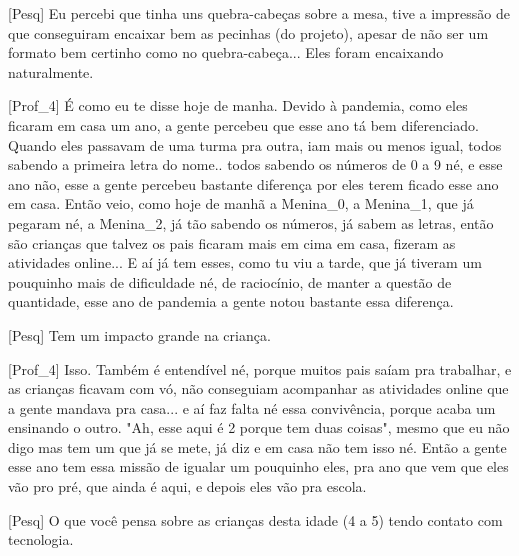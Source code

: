 [Pesq] Eu percebi que tinha uns quebra-cabeças sobre a mesa, tive a impressão de que conseguiram encaixar bem as pecinhas (do projeto), apesar de não ser um formato bem certinho como no quebra-cabeça... Eles foram encaixando naturalmente.

[Prof\_4] É como eu te disse hoje de manha. Devido à pandemia, como eles ficaram em casa um ano, a gente percebeu que esse ano tá bem diferenciado. Quando eles passavam de uma turma pra outra, iam mais ou menos igual, todos sabendo a primeira letra do nome.. todos sabendo os números de 0 a 9 né, e esse ano não, esse a gente percebeu bastante diferença por eles terem ficado esse ano em casa. Então veio, como hoje de manhã a Menina\_0, a Menina\_1, que já pegaram né, a Menina\_2, já tão sabendo os números, já sabem as letras, então são crianças que talvez os pais ficaram mais em cima em casa, fizeram as atividades online... E aí já tem esses, como tu viu a tarde, que já tiveram um pouquinho mais de dificuldade né, de raciocínio, de manter a questão de quantidade, esse ano de pandemia a gente notou bastante essa diferença.

[Pesq] Tem um impacto grande na criança.

[Prof\_4] Isso. Também é entendível né, porque muitos pais saíam pra trabalhar, e as crianças ficavam com vó, não conseguiam acompanhar as atividades online que a gente mandava pra casa... e aí faz falta né essa convivência, porque acaba um ensinando o outro. "Ah, esse aqui é 2 porque tem duas coisas", mesmo que eu não digo mas tem um que já se mete, já diz e em casa não tem isso né. Então a gente esse ano tem essa missão de igualar um pouquinho eles, pra ano que vem que eles vão pro pré, que ainda é aqui, e depois eles vão pra escola. 

[Pesq] O que você pensa sobre as crianças desta idade (4 a 5) tendo contato com tecnologia. 

